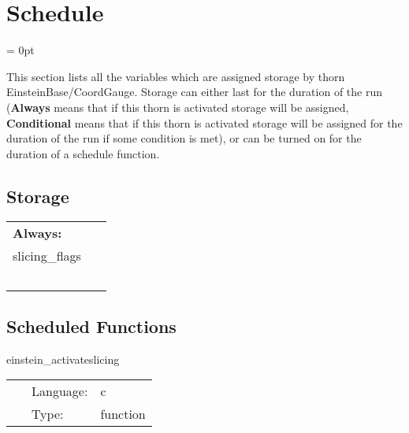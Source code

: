
\section{Schedule} 


\parskip = 0pt


\noindent This section lists all the variables which are assigned storage by thorn EinsteinBase/CoordGauge.  Storage can either last for the duration of the run ({\bf Always} means that if this thorn is activated storage will be assigned, {\bf Conditional} means that if this thorn is activated storage will be assigned for the duration of the run if some condition is met), or can be turned on for the duration of a schedule function.


\subsection*{Storage}

\hspace{5mm}

 \begin{tabular*}{160mm}{ll} 

{\bf Always:}&  ~ \\ 
 slicing\_flags & ~\\ 
~ & ~\\ 
\end{tabular*} 


\subsection*{Scheduled Functions}
\vspace{5mm}


\hspace{5mm} einstein\_activateslicing 

\hspace{5mm}{\it initialize slicing, setup priorities for mixed slicings } 


\hspace{5mm}

 \begin{tabular*}{160mm}{cll} 
~ & Language:  & c \\ 
~ & Type:  & function \\ 
\end{tabular*} 


\vspace{5mm}


